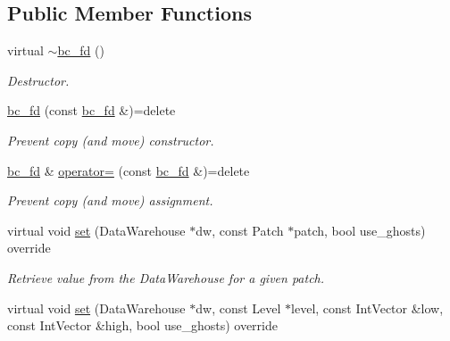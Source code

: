 \subsection*{Public Member Functions}
\begin{DoxyCompactItemize}
\item 
virtual \hyperlink{classUintah_1_1PhaseField_1_1detail_1_1bc__fd_3_01ScalarField_3_01T_01_4_00_01STN_00_01VAR_00_01ce55d0bf8381798bc129da931b626e80_a4188396ef5d9794ba158d0fe1b1ccefa}{$\sim$bc\+\_\+fd} ()
\begin{DoxyCompactList}\small\item\em Destructor. \end{DoxyCompactList}\item 
\hyperlink{classUintah_1_1PhaseField_1_1detail_1_1bc__fd_3_01ScalarField_3_01T_01_4_00_01STN_00_01VAR_00_01ce55d0bf8381798bc129da931b626e80_a697161ed958dc972a88658e957c2db28}{bc\+\_\+fd} (const \hyperlink{classUintah_1_1PhaseField_1_1detail_1_1bc__fd}{bc\+\_\+fd} \&)=delete
\begin{DoxyCompactList}\small\item\em Prevent copy (and move) constructor. \end{DoxyCompactList}\item 
\hyperlink{classUintah_1_1PhaseField_1_1detail_1_1bc__fd}{bc\+\_\+fd} \& \hyperlink{classUintah_1_1PhaseField_1_1detail_1_1bc__fd_3_01ScalarField_3_01T_01_4_00_01STN_00_01VAR_00_01ce55d0bf8381798bc129da931b626e80_a62d7c0a3b6774bf5b54674a8b3d71781}{operator=} (const \hyperlink{classUintah_1_1PhaseField_1_1detail_1_1bc__fd}{bc\+\_\+fd} \&)=delete
\begin{DoxyCompactList}\small\item\em Prevent copy (and move) assignment. \end{DoxyCompactList}\item 
virtual void \hyperlink{classUintah_1_1PhaseField_1_1detail_1_1bc__fd_3_01ScalarField_3_01T_01_4_00_01STN_00_01VAR_00_01ce55d0bf8381798bc129da931b626e80_ac70a40f99b59aafe8dc8166ccd48347f}{set} (Data\+Warehouse $\ast$dw, const Patch $\ast$patch, bool use\+\_\+ghosts) override
\begin{DoxyCompactList}\small\item\em Retrieve value from the Data\+Warehouse for a given patch. \end{DoxyCompactList}\item 
virtual void \hyperlink{classUintah_1_1PhaseField_1_1detail_1_1bc__fd_3_01ScalarField_3_01T_01_4_00_01STN_00_01VAR_00_01ce55d0bf8381798bc129da931b626e80_a69189cb1ecb842a77f9b17e4c2c2ba4e}{set} (Data\+Warehouse $\ast$dw, const Level $\ast$level, const Int\+Vector \&low, const Int\+Vector \&high, bool use\+\_\+ghosts) override

\end{DoxyCompactItemize}
